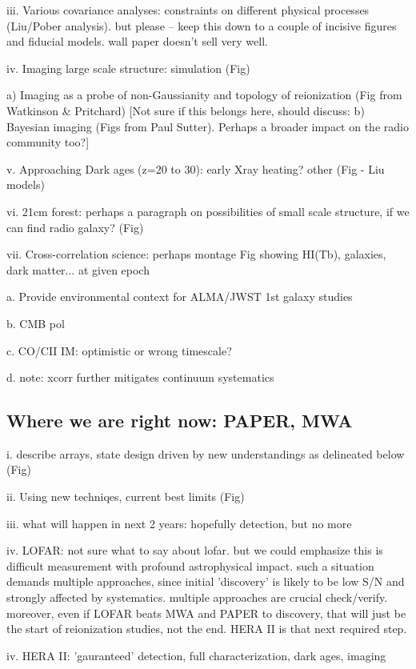\documentclass[preprint]{aastex}
\begin{document}
iii. Various covariance analyses: constraints on different physical processes (Liu/Pober analysis). but
please -- keep this down to a couple of incisive figures and fiducial models. wall paper doesn't sell very well. 

iv. Imaging large scale structure: simulation (Fig) 
    
a) Imaging as a probe of non-Gaussianity and topology of reionization (Fig from Watkinson & Pritchard)
[Not sure if this belongs here, should discuss: b) Bayesian imaging (Figs from Paul Sutter).  
Perhaps a broader impact on the radio community too?]

v. Approaching Dark ages (z=20 to 30): early Xray heating? other (Fig - Liu models)

vi. 21cm forest: perhaps a paragraph on possibilities of small scale structure, if we can find radio galaxy? (Fig) 

vii. Cross-correlation science: perhaps montage Fig showing HI(Tb), galaxies, dark matter... at given epoch

a. Provide environmental context for ALMA/JWST 1st galaxy studies

b. CMB pol 

c. CO/CII IM: optimistic or wrong timescale?
  
d. note: xcorr further mitigates continuum systematics

\subsection{Where we are right now: PAPER, MWA}  %

i. describe arrays, state design driven by new understandings as delineated below (Fig)

ii. Using new techniqes, current best limits  (Fig)

iii. what will happen in next 2 years: hopefully detection, but no more

iv. LOFAR: not sure what to say about lofar. but we could emphasize this is difficult measurement with 
profound astrophysical impact. such a situation demands multiple approaches, since initial 'discovery' is 
likely to be low S/N and strongly affected by systematics. multiple approaches are crucial check/verify. 
moreover, even if LOFAR beats MWA and PAPER to discovery, that will just be the start of reionization 
studies, not the end. HERA II is that next required step. 

iv. HERA II: 'gauranteed' detection, full characterization, dark ages, imaging
\end{document}
